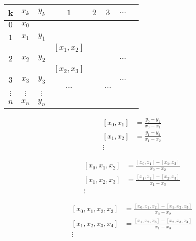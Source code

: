 
\noindent\begin{tabularx}{\linewidth}{cccccccX}
\toprule
 k	&$x_k$	&$y_k$		&$1$		&$2$		&$3$			&$\ldots$	\\ \midrule
 $0$	&$x_0$	&\hebox{$y_0$}	&		&		&			&		\\
	&	&		&\hebox{$[x_0,x_1]$}	&		&			&		\\
 $1$	&$x_1$	&$y_1$		&		&\hebox{$[x_0,x_1,x_2]$}&			&		\\
 	&	&		&$[x_1,x_2]$	&		&\hebox{$[x_0,x_1,x_2,x_3]$}	&		\\
 $2$	&$x_2$	&$y_2$		&		&\heboxc{$[x_1,x_2,x_3]$}&			&$\ldots$	\\
 	&	&		&$[x_2,x_3]$	&		&\heboxc{$[x_1,x_2,x_3,x_4]$}	&		\\
 $3$	&$x_3$	&$y_3$		&		&\heboxc{$[x_2,x_3,x_4]$}&			&$\ldots$	\\
 	&	&		&$\ldots$	&		&$\ldots$		&		\\
 $\vdots$&$\vdots$&$\vdots$	&		&		&			&		\\
 $n$	&$x_n$	&$y_n$		&		&		&			&		\\ \bottomrule
\end{tabularx}

\begin{shaded}
\begin{minipage}{.5\textwidth}

 \begin{equation}
 \left.\begin{aligned}
  [x_0,x_1]&=\frac{y_0-y_1}{x_0-x_1}\\
  [x_1,x_2]&=\frac{y_1-y_2}{x_1-x_2} \\
\vdots &
 \end{aligned}\right.
\end{equation} 
\end{minipage}\begin{minipage}{.5\textwidth}
 \begin{equation}
 \left.\begin{aligned}
  [x_0,x_1,x_2]&=\frac{[x_0,x_1]-[x_1,x_2]}{x_0-x_2}\\
  [x_1,x_2,x_3]&=\frac{[x_1,x_2]-[x_2,x_3]}{x_1-x_3} \\
\vdots &
 \end{aligned}\right.
\end{equation} 

\end{minipage}\end{shaded}
\begin{shaded}
 \begin{equation}
 \left.\begin{aligned}
  [x_0,x_1,x_2,x_3]&=\frac{[x_0,x_1,x_2]-[x_1,x_2,x_3]}{x_0-x_2}\\
  [x_1,x_2,x_3,x_4]&=\frac{[x_1,x_2,x_3]-[x_2,x_3,x_4]}{x_1-x_3} \\
\vdots &
 \end{aligned}\right.
\end{equation} 
\end{shaded}



